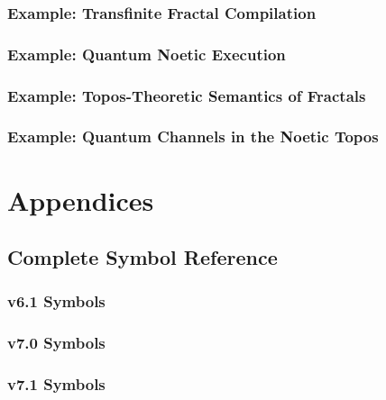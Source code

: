 \documentclass[11pt,twoside,openright]{book}
\theoremstyle{definition}
\theoremstyle{plain}
\theoremstyle{remark}
\begin{document}

\section{Example: Transfinite Fractal Compilation}

\section{Example: Quantum Noetic Execution}

\section{Example: Topos-Theoretic Semantics of Fractals}

\section{Example: Quantum Channels in the Noetic Topos}

\part{Appendices}
\label{part:appendices}

\chapter{Complete Symbol Reference}
\label{ch:symbol-reference}

\section{v6.1 Symbols}

\section{v7.0 Symbols}

\section{v7.1 Symbols}
\end{document}
